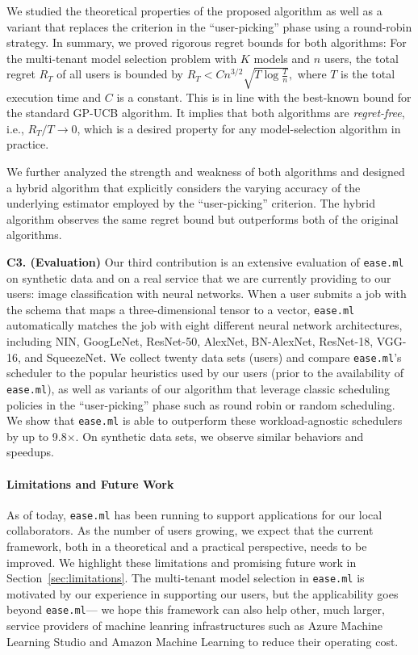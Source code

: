 \documentclass[letterpaper]{vldb}
\newcommand{\eml}{\texttt{ease.ml}\xspace}
\begin{document}
We studied the theoretical properties of the proposed algorithm as well as a variant that replaces the criterion in the ``user-picking'' phase using a round-robin strategy.
In summary, we proved rigorous regret bounds for both algorithms: For the multi-tenant model selection problem 
with $K$ models and $n$ users, 
the total regret $R_T$ of all users is bounded by 
$
R_T < C n^{3/2}\sqrt{T\log \frac{T}{n}}, 
$
where $T$ is the total execution time
and $C$ is a constant.
This is in line with the best-known bound for the standard GP-UCB algorithm.
It implies that both algorithms are \emph{regret-free}, i.e., $R_T/T \rightarrow 0$, which is a desired property for any model-selection algorithm in practice.

We further analyzed the strength and weakness of both algorithms and designed a hybrid algorithm that explicitly considers
the varying accuracy of the underlying estimator employed by the ``user-picking'' criterion.
The hybrid algorithm observes the same regret bound but outperforms both of the original algorithms.


\vspace{0.5em}
\noindent
{\bf C3. (Evaluation)} Our third contribution is an extensive
evaluation of \eml on synthetic data and on a real service that we are currently providing to our users: image classification 
with neural networks.
When a user submits a job with the schema
that maps a three-dimensional tensor to
a vector, \eml automatically matches the job with eight
different neural network architectures, including
NIN, GoogLeNet, ResNet-50, AlexNet,
BN-AlexNet, ResNet-18, VGG-16,
and SqueezeNet. We collect twenty 
data sets (users) and compare
\eml's scheduler to the popular heuristics 
used by our users (prior to the availability of \eml), as well as variants of our algorithm that leverage classic scheduling policies in the ``user-picking'' phase such as round robin or random scheduling.
We show that \eml is able to outperform
these workload-agnostic schedulers
by up to 9.8$\times$. On synthetic data sets,
we observe similar behaviors and speedups.

\vspace{-0.5em}
\paragraph*{Limitations and Future Work}
As of today, \eml has been running to support 
applications for our local collaborators. 
As the number of users growing, we
expect that the current framework, both in a
theoretical and a practical perspective,
needs to be improved. We highlight these
limitations and promising future work in 
Section~\ref{sec:limitations}. The multi-tenant
model selection in \eml is motivated by
our experience in supporting our users, but 
the applicability goes beyond \eml --- we hope
this framework can also help other, much larger, service providers
of machine leanring infrastructures such as 
Azure Machine Learning Studio
and Amazon Machine Learning
to reduce their operating
cost.
\end{document}
